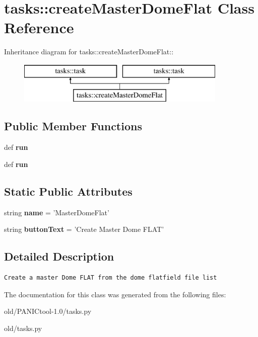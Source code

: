 \section{tasks::create\-Master\-Dome\-Flat Class Reference}
\label{classtasks_1_1createMasterDomeFlat}
Inheritance diagram for tasks::create\-Master\-Dome\-Flat::\begin{figure}[H]
\begin{center}
\leavevmode
\includegraphics[height=2cm]{classtasks_1_1createMasterDomeFlat}
\end{center}
\end{figure}
\subsection*{Public Member Functions}
\begin{CompactItemize}
\item 
def \textbf{run}\label{classtasks_1_1createMasterDomeFlat_38c3a079e414119295ac097f7e448afa}

\item 
def \textbf{run}\label{classtasks_1_1createMasterDomeFlat_38c3a079e414119295ac097f7e448afa}

\end{CompactItemize}
\subsection*{Static Public Attributes}
\begin{CompactItemize}
\item 
string \textbf{name} = '{\bfcreate\-Master\-Dome\-Flat}'\label{classtasks_1_1createMasterDomeFlat_ff15c09eda22ae0f6e9023ba853fa3c5}

\item 
string \textbf{button\-Text} = 'Create Master Dome FLAT'\label{classtasks_1_1createMasterDomeFlat_1dbc69828d6b8c7191c1b36c5817ec05}

\end{CompactItemize}


\subsection{Detailed Description}


\footnotesize\begin{verbatim}Create a master Dome FLAT from the dome flatfield file list
\end{verbatim}
\normalsize
 



The documentation for this class was generated from the following files:\begin{CompactItemize}
\item 
old/PANICtool-1.0/tasks.py\item 
old/tasks.py\end{CompactItemize}
